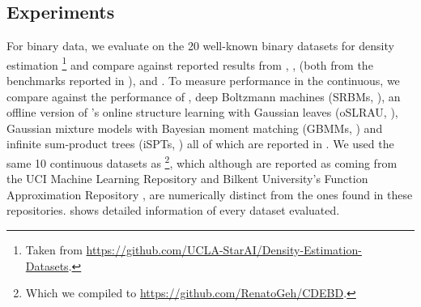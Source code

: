 \subsection{Experiments}

For binary data, we evaluate  on the 20 well-known binary datasets for density
estimation \citep{lowd10,haaren12}\footnote{Taken from
\url{https://github.com/UCLA-StarAI/Density-Estimation-Datasets}.} and compare against reported
results from  \citep{gens13}, ,  (both
from the benchmarks reported in \cite{dang20}),  \citep{jaini18a} and
 \citep{dimauro21}. To measure performance in the continuous, we compare
 against the performance of , deep Boltzmann machines (SRBMs,
\cite{salakhutdinov09}), an offline version of \citeauthor{hsu17}'s online structure learning with
Gaussian leaves (oSLRAU, \cite{hsu17}), Gaussian mixture models with Bayesian moment matching
(GBMMs, \cite{jaini16}) and infinite sum-product trees (iSPTs, \cite{trapp16}) all of which are
reported in \citet{jaini18a}. We used the same 10 continuous datasets as
\citet{jaini18a}\footnote{Which we compiled to \url{https://github.com/RenatoGeh/CDEBD}.}, which
although are reported as coming from the UCI Machine Learning Repository \citep{dua17} and Bilkent
University's Function Approximation Repository \citep{guvenir00}, are numerically distinct from the
ones found in these repositories.  shows detailed information of every dataset
evaluated.

